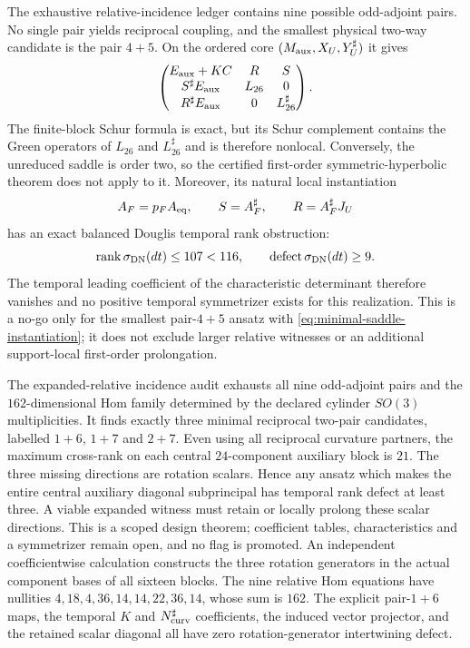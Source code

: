 \documentclass[11pt]{article}
\theoremstyle{definition}
\theoremstyle{remark}
\newcommand{\rank}{\operatorname{rank}}
\begin{document}
The exhaustive relative-incidence ledger contains nine possible odd-adjoint
pairs.  No single pair yields reciprocal coupling, and the smallest physical
two-way candidate is the pair $4+5$.  On the ordered core
$(M_{\rm aux},X_U,Y_U^\sharp)$ it gives
\begin{equation}\label{eq:minimal-relative-saddle}
 \begin{pmatrix}
 E_{\rm aux}+KC & R & S\\
 S^\sharp E_{\rm aux} & L_{26} & 0\\
 R^\sharp E_{\rm aux} & 0 & L_{26}^\sharp
 \end{pmatrix}.
\end{equation}
The finite-block Schur formula is exact, but its Schur complement contains
the Green operators of $L_{26}$ and $L_{26}^\sharp$ and is therefore
nonlocal.  Conversely, the unreduced saddle is order two, so the certified
first-order symmetric-hyperbolic theorem does not apply to it.  Moreover, its
natural local instantiation
\begin{equation}\label{eq:minimal-saddle-instantiation}
 A_F=p_F A_{\rm eq},
 \qquad S=A_F^\sharp,
 \qquad R=A_F^\sharp J_U
\end{equation}
has an exact balanced Douglis temporal rank obstruction:
\begin{equation}\label{eq:minimal-saddle-rank-no-go}
 \rank\sigma_{\rm DN}(dt)\leq107<116,
 \qquad \operatorname{defect}\sigma_{\rm DN}(dt)\geq9.
\end{equation}
The temporal leading coefficient of the characteristic determinant therefore
vanishes and no positive temporal symmetrizer exists for this realization.
This is a no-go only for the smallest pair-$4+5$ ansatz with
\eqref{eq:minimal-saddle-instantiation}; it does not exclude larger relative
witnesses or an additional support-local first-order prolongation.

The expanded-relative incidence audit exhausts all nine odd-adjoint pairs
and the $162$-dimensional Hom family determined by the declared cylinder
$SO(3)$ multiplicities.  It finds exactly
three minimal reciprocal two-pair candidates, labelled $1+6$, $1+7$ and
$2+7$.  Even using all reciprocal curvature partners, the maximum cross-rank
on each central $24$-component auxiliary block is $21$.  The three missing
directions are rotation scalars.  Hence any ansatz which makes the entire
central auxiliary diagonal subprincipal has temporal rank defect at least
three.  A viable expanded witness must retain or locally prolong these scalar
directions.  This is a scoped design theorem; coefficient tables,
characteristics and a symmetrizer remain open, and no flag is promoted.
An independent coefficientwise calculation constructs the three rotation
generators in the actual component bases of all sixteen blocks.  The nine
relative Hom equations have nullities
$4,18,4,36,14,14,22,36,14$, whose sum is $162$.  The explicit pair-$1+6$
maps, the temporal $K$ and $N_{\rm curv}^{\sharp}$ coefficients, the induced
vector projector, and the retained scalar diagonal all have zero
rotation-generator intertwining defect.
\end{document}
